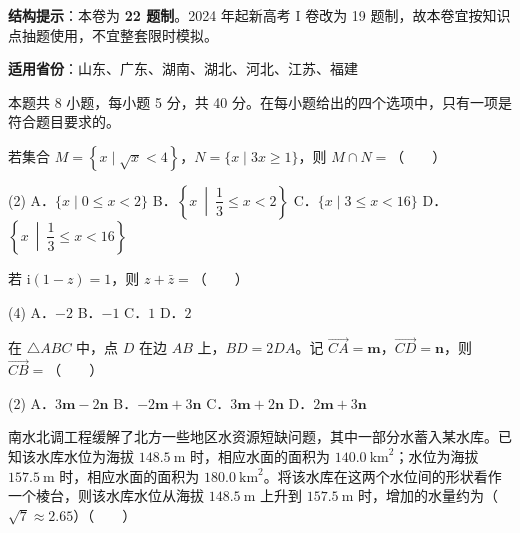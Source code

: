 

\begin{gknotice}
\textbf{结构提示}：本卷为 \textbf{22 题制}。2024 年起新高考 I 卷改为 19 题制，故本卷宜按知识点抽题使用，不宜整套限时模拟。

\textbf{适用省份}：山东、广东、湖南、湖北、河北、江苏、福建
\end{gknotice}

\par\medskip


\begin{gktip}
本题共 8 小题，每小题 5 分，共 40 分。在每小题给出的四个选项中，只有一项是符合题目要求的。
\end{gktip}

若集合 $M=\left\{x\mid\sqrt x<4\right\}$，$N=\{x\mid3x\ge1\}$，则 $M\cap N=$（　　）

\begin{gkopts}(2)
\task A．$\{x\mid0\le x<2\}$
\task B．$\left\{x\ \middle|\ \dfrac13\le x<2\right\}$
\task C．$\{x\mid3\le x<16\}$
\task D．$\left\{x\ \middle|\ \dfrac13\le x<16\right\}$
\end{gkopts}

若 $\mathrm i(1-z)=1$，则 $z+\bar z=$（　　）

\begin{gkopts}(4)
\task A．$-2$
\task B．$-1$
\task C．$1$
\task D．$2$
\end{gkopts}

在 $\triangle ABC$ 中，点 $D$ 在边 $AB$ 上，$BD=2DA$。记 $\overrightarrow{CA}=\boldsymbol m$，$\overrightarrow{CD}=\boldsymbol n$，则 $\overrightarrow{CB}=$（　　）

\begin{gkopts}(2)
\task A．$3\boldsymbol m-2\boldsymbol n$
\task B．$-2\boldsymbol m+3\boldsymbol n$
\task C．$3\boldsymbol m+2\boldsymbol n$
\task D．$2\boldsymbol m+3\boldsymbol n$
\end{gkopts}

南水北调工程缓解了北方一些地区水资源短缺问题，其中一部分水蓄入某水库。已知该水库水位为海拔 $148.5\ \mathrm m$ 时，相应水面的面积为 $140.0\ \mathrm{km}^{2}$；水位为海拔 $157.5\ \mathrm m$ 时，相应水面的面积为 $180.0\ \mathrm{km}^{2}$。将该水库在这两个水位间的形状看作一个棱台，则该水库水位从海拔 $148.5\ \mathrm m$ 上升到 $157.5\ \mathrm m$ 时，增加的水量约为（$\sqrt7\approx2.65$）（　　）

